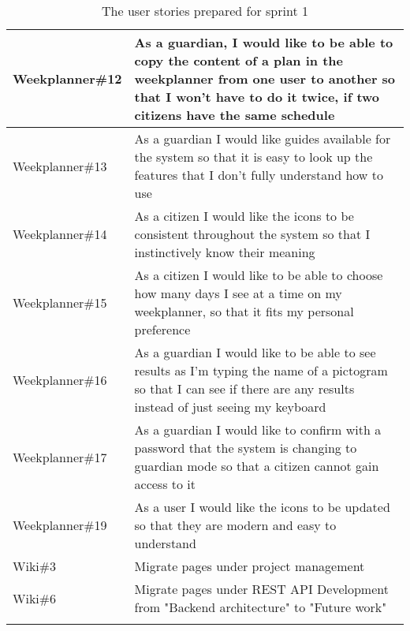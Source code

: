 \begin{longtable}{|p{}|p{}|}
    Weekplanner\#12 & As a guardian, I would like to be able to copy the content of a plan in the weekplanner from one user to another so that I won't have to do it twice, if two citizens have the same schedule \\ \hline
    Weekplanner\#13 & As a guardian I would like guides available for the system so that it is easy to look up the features that I don't fully understand how to use                                               \\ \hline
    Weekplanner\#14 & As a citizen I would like the icons to be consistent throughout the system so that I instinctively know their meaning                                                                        \\ \hline
    Weekplanner\#15 & As a citizen I would like to be able to choose how many days I see at a time on my weekplanner, so that it fits my personal preference                                                       \\ \hline
    Weekplanner\#16 & As a guardian I would like to be able to see results as I'm typing the name of a pictogram so that I can see if there are any results instead of just seeing my keyboard                     \\ \hline
    Weekplanner\#17 & As a guardian I would like to confirm with a password that the system is changing to guardian mode so that a citizen cannot gain access to it                                                \\ \hline
    Weekplanner\#19 & As a user I would like the icons to be updated so that they are modern and easy to understand                                                                                                \\ \hline
    Wiki\#3         & Migrate pages under project management                                                                                                                                                       \\ \hline
    Wiki\#6         & Migrate pages under REST API Development from "Backend architecture" to "Future work"                                                                                                        \\ \hline
    \caption{The user stories prepared for sprint 1}
    \label{User-stories-for-first-sprint}
\end{longtable}

